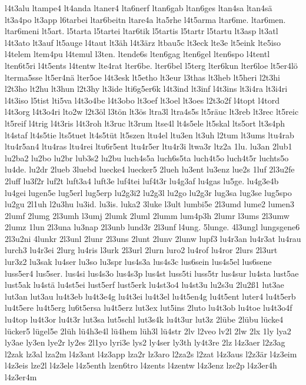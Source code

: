 {l4t3alu
ltampe4
lt4anda
ltaner4
lta6nerf
ltan6gab
ltan6ges
ltan4sa
ltan4sä
lt3a4po
lt3app
l6tarbei
ltar6beitn
ltare4a
lta5rhe
l4t5arma
ltar6me.
ltar6men.
ltar6meni
lt5art.
l5tarta
l5tartei
ltar6tik
l5tartis
l5tartr
l5tartu
lt3asp
lt3atl
l4t3ato
lt3auf
lt5auge
l4taut
lt3äh
l4t3ärz
ltbau5c
lt3eck
lte3e
lt5eink
lte5iso
l4telem
ltem4pu
l4temul
l3ten.
ltende6s
lten6gag
lten6gel
lten6spo
l4tentl
lten6t5ri
l4t5ents
l4tentw
lte4rat
lter6be.
lter6bel
l5terg
lter6kun
lter6loe
lt5er4lö
lterma5sse
lt5er4nä
lter5oe
l4t3esk
lt5etho
lt3eur
l3thas
lt3heb
lt5heri
l2t3hi
l2t3ho
lt2hu
lt3hun
l2t3hy
lt3ide
lti6g5er6k
l4t3ind
lt3inf
l4t3ins
lt3i4ra
lt3i4ri
l4t3iso
l5tist
lti5va
l4t3o4be
l4t3obo
lt3oef
lt3oel
lt3oes
l2t3o2f
l4topt
l4tord
l4t3org
l4t3o4ri
lto2w
l2t3öl
l3tön
lt3ös
ltra3l
ltra4s5s
lt5räuc
lt3reb
lt3rec
lt5reic
lt5reif
l4trig
l4t3ris
l4t3roh
lt3ruc
lt3rum
ltse4l
lt4s5ele
lt5skal
lts5ort
lt3s4ph
lt4staf
lt4s5tie
lts5tuet
lt4s5tüt
lt5szen
ltu4el
ltu3en
lt3uh
l2tum
lt3ums
ltu4rab
ltu4r5an4
ltu4ras
ltu4rei
ltu6r5ent
ltu4r5er
ltu4r3i
ltwa3r
ltz2a
1lu.
lu3an
2lub1
lu2ba2
lu2bo
lu2br
lub3s2
lu2bu
luch4s5a
luch6s5ta
luch4t5o
luch4t5r
luchts5o
lu4de.
lu2dr
2lueb
3luebd
luecke4
luecker5
2lueh
lu3ent
lu3enz
lue2s
1luf
2l3u2fe
2luff
lu3f2r
luf2t
luft3a4
luft3e
luf4tei
luf4t3r
lu4g3af
lu4gas
lu5ge.
lu4g3e4b
lu4gei
lugen5e
lug5erl
lug5erp
lu2g3i2
lu2g3l
lu2go
lu2g3r
lug3sa
lug3se
lug5spo
lu2gu
2l1uh
l2u3hu
lu3id.
lu3is.
luka2
3luke
l3ult
lumbi5e
2l3umd
lume2
lumen3
2lumf
2lumg
2l3umh
l3umj
2lumk
2luml
2lumm
lum4p3h
2lumr
l3ums
2l3umw
2lumz
1lun
2l3una
lu3nap
2l3unb
lund3r
2l3unf
l4ung.
5lunge.
4l3ungl
lungsgene6
2l3u2ni
4lunkr
2l3unl
2lunr
2l3uns
2lunt
2lunv
2lunw
lupf3
lu4r3an
lu4r3at
lu4rau
lurch3
lu4r3ei
2lurg
lu4ris
l3urk
2l3url
2lurn
luro2
lu4rof
lu4ror
2lurs
2l3urt
lur3z2
lu3sak
lu4ser
lu3so
lu3spr
lus4s3a
lus4s3c
lus6sein
lus4s5el
lus6sene
luss5er4
lus5ser.
lus4si
lus4s3o
lus4s3p
lus4st
luss5ti
luss5tr
lus4sur
lu4sta
lust5ae
lust5ak
lu4stä
lu4st5ei
lust5erf
lust5erk
lu4st3o4
lu4st3u
lu2s3u
2lu2ß1
lut3ae
lut3an
lut3au
lu4t3eb
lu4t3e4g
lu4t3ei
lu4t3el
lu4t5en4g
lu4t5ent
luter4
lu4t5erb
lu4t5ere
lu4t5erg
lu6t5ersa
lu4t5erz
lut3ex
lut5ins
2luto
lu4t3ob
lu4toe
lu4t3o4f
lu4top
lu4t3or
lu4t3r
lut3sa
lut5schl
lut3s4k
lu4t3ur
lut3z
2lübe
2lübu
lücke4
lücker5
lügel5e
2lüh
lü4h3e4l
lü4hem
lüh3l
lü4str
2lv
l2veo
lv2l
2lw
2lx
1ly
lya2
ly3ae
ly3en
lye2r
ly2es
2l1yo
lyri3e
lys2
ly4ser
ly3th
ly4t3re
2lz
l4z3aer
l2z3ag
l2zak
lz3al
lza2m
l4z3ant
l4z3app
lza2r
lz3aro
l2za2s
l2zat
l4z3aus
l2z3är
l4z3eim
l4z3eis
lze2l
l4z3ele
l4z5enth
lzen6tro
l4zents
l4zentw
l4z3enz
lze2p
l4z3er4h
l4z3er4m
}
